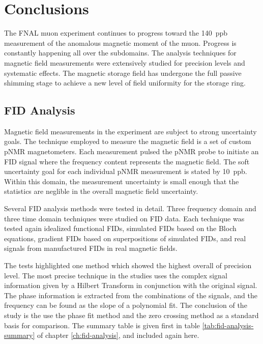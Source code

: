 \chapter{Conclusions}

The FNAL muon \gmtwo experiment continues to progress toward the \SI{140}{ppb} measurement of the anomalous magnetic moment of the muon.  Progress is constantly happening all over the \mugmtwo subdomains.  The analysis techniques for magnetic field measurements were extensively studied for precision levels and systematic effects.  The magnetic storage field has undergone the full passive shimming stage to achieve a new level of field uniformity for the \gmtwo storage ring.

\section{FID Analysis}

Magnetic field measurements in the \mugmtwo experiment are subject to strong uncertainty goals.  The technique employed to measure the magnetic field is a set of custom pNMR magnetometers.  Each measurement pulsed the pNMR probe to initiate an FID signal where the frequency content represents the magnetic field.  The soft uncertainty goal for each individual pNMR measurement is stated by \SI{10}{ppb}.  Within this domain, the measurement uncertainty is small enough that the statistics are neglible in the overall magnetic field uncertainty.

Several FID analysis methods were tested in detail.  Three frequency domain and three time domain techniques were studied on FID data.  Each technique was tested again idealized functional FIDs, simulated FIDs based on the Bloch equations, gradient FIDs based on superpositions of simulated FIDs, and real signals from manufactured FIDs in real magnetic fields.  

The tests highlighted one method which showed the highest overall of precision level.  The most precise technique in the studies uses the complex signal information given by a Hilbert Transform in conjunction with the original signal.  The phase information is extracted from the combinations of the signals, and the frequency can be found as the slope of a polynomial fit.  The conclusion of the study is the use the phase fit method and the zero crossing method as a standard basis for comparison.  The summary table is given first in table \ref{tab:fid-analysis-summary} of chapter \ref{ch:fid-analysis}, and included again here.


